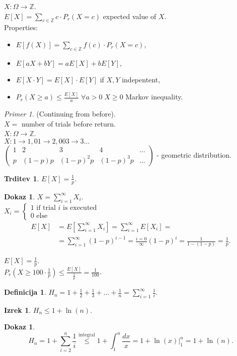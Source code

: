 \documentclass[a4paper, 12pt]{book}
\newcommand*\Eval[3]{\left.#1\right\rvert_{#2}^{#3}}
\theoremstyle{definition}
\newtheorem{defn}[counter]{Definicija}
\newtheorem{claim}[counter]{Trditev}
\newtheorem{theorem}[counter]{Izrek}
\newtheorem{pro}[counter]{Dokaz}
\theoremstyle{remark}
\newtheorem*{ex}{Primer}
\newcommand{\Z}{\mathbb{Z}}
\begin{document}
$X: \Omega \to \Z$. \\
$E[X] = \sum_{c \in \Z} c \cdot P_r(X = c)$ expected value of $X$. \\
Properties:
\begin{itemize}[label=$\circ$]
  \item $E[f(X)] = \sum_{c \in \Z} f(c) \cdot P_r(X = c)$,
  \item $E[aX + bY] = aE[X] + bE[Y]$,
  \item $E[X \cdot Y] = E[X] \cdot E[Y]$ if $X, Y$ indepentent,
  \item $P_r(X \geq a) \leq \frac{E[X]}{a} \; \forall a > 0 \; X \geq 0$ Markov inequality.
\end{itemize}
\begin{ex}
  (Continuing from before). \\
  $X =$ number of trials before return. \\
  $X: \Omega \to \Z$. \\
  $X: 1 \to 1, 01 \to 2, 003 \to 3 \dots$ \\
  $\begin{pmatrix}
    1 & 2 & 3 & 4 & \dots \\
    p & (1-p)p & (1-p)^2 p & (1-p)^3p & \dots
  \end{pmatrix}$ - geometric distribution.
\end{ex}
\begin{claim}
  $E[X] = \frac{1}{p}$.
\end{claim}
\begin{pro}
  $X = \sum_{i=1}^{\infty} X_i$. \\
  $X_i = \begin{cases}
    1 \text{ if trial $i$ is executed} \\
    0 \text{ else}
  \end{cases}$ \\
  \begin{align*}
    E[X] &= E[\sum_{i=1}^{\infty} X_i] = \sum_{i=1}^{\infty} E[X_i] = \\
    &= \sum_{i=1}^{\infty} (1-p)^{i-1} = \frac{i=0}{\infty} (1-p)^i = \frac{1}{1-(1-p)} = \frac{1}{p}.
  \end{align*}
\end{pro}
$E[X] = \frac{1}{p}$. \\
$P_r(X \geq 100 \cdot \frac{1}{p}) \leq \frac{E[X]}{\frac{1}{p}} = \frac{1}{100}$.
\begin{defn}
  $H_n = 1 + \frac{1}{2} + \frac{1}{3} + \dots + \frac{1}{n} = \sum_{i=1}^{\infty} \frac{1}{i}$.
\end{defn}
\begin{theorem}
  $H_n \leq 1 + \ln(n)$.
\end{theorem}
\begin{pro}
  \begin{equation*}
    H_n = 1 + \sum_{i=2}^{n} \frac{1}{i} \stackrel{\text{integral}}{\leq}
    1 + \int_{1}^{n} \frac{dx}{x} = 1 + \Eval{\ln(x)}{1}{n} = 1 + \ln(n).
  \end{equation*}
\end{pro}
\end{document}
